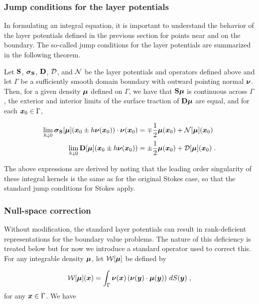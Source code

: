 \subsubsection{Jump conditions for the layer potentials}

In formulating an integral equation, it is important
to understand the behavior of the layer potentials
defined in the previous section for points near and on the
boundary. The so-called jump conditions for the layer
potentials are summarized in the following theorem.


\begin{lem} \label{lem:jump-conds}
  Let ${\bf S}$, ${\boldsymbol \sigma}_{\bf S}$, ${\bf D}$, ${\mathcal D}$, and ${\mathcal N}$ be
  the layer potentials and operators defined above and
  let $\Gamma$ be a sufficiently smooth domain boundary
  with outward pointing normal ${\boldsymbol \nu}$. Then, for
  a given density ${\boldsymbol \mu}$ defined on $\Gamma$,
  we have that ${\bf S} {\boldsymbol \mu}$
  is continuous across $\Gamma$, the exterior and interior
  limits of the surface traction of ${\bf D} {\boldsymbol \mu}$ are equal,
  and for each ${\boldsymbol x}_0 \in \Gamma$,

  \begin{align}
    \lim_{h \downarrow 0} {\boldsymbol \sigma}_{\bf S}[{\boldsymbol \mu}]({\boldsymbol x}_0 \pm h{\boldsymbol \nu}({\boldsymbol x}_0)) \cdot {\boldsymbol \nu}({\boldsymbol x}_0)
    &= \mp \frac{1}{2} {\boldsymbol \mu}({\boldsymbol x}_0) + {\mathcal N}[{\boldsymbol \mu}]({\boldsymbol x}_0) \\
    \lim_{h \downarrow 0} {\bf D}[{\boldsymbol \mu}]({\boldsymbol x}_0 \pm h{\boldsymbol \nu}({\boldsymbol x}_0)) 
    &= \pm \frac{1}{2} {\boldsymbol \mu}({\boldsymbol x}_0) + {\mathcal D}[{\boldsymbol \mu}]({\boldsymbol x}_0)    \; .
  \end{align}
\end{lem}

The above expressions are derived by noting that the
leading order singularity of these integral kernels
is the same as for the original Stokes case, so that
the standard jump conditions for Stokes
\cite{KimSangtae1991M:pa,Pozrikidis1992}
apply. 


\subsubsection{Null-space correction}

Without modification, the standard layer potentials
can result in rank-deficient representations for
the boundary value problems. The nature of this deficiency
is treated below but for now we introduce a standard
operator used to correct this. For any integrable density
${\boldsymbol \mu}$, let ${\mathcal W}[{\boldsymbol \mu}]$ be defined by

\begin{equation} \label{eq:ones_operator}
  {\mathcal W}[{\boldsymbol \mu}]({\boldsymbol x}) = \int_\Gamma {\boldsymbol \nu}({\boldsymbol x})
  \left ( {\boldsymbol \nu}({\boldsymbol y}) \cdot {\boldsymbol \mu}({\boldsymbol y}) \right )
  \, dS({\boldsymbol y}) \; ,
\end{equation}
for any ${\boldsymbol x} \in \Gamma$. We have

